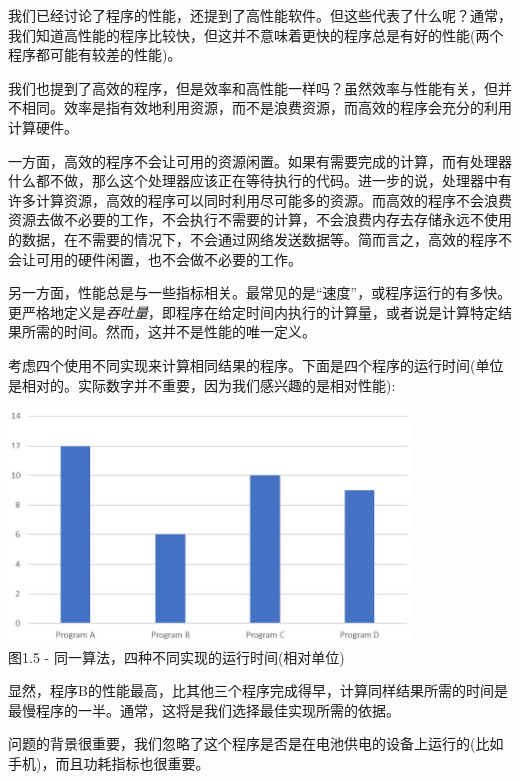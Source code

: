 我们已经讨论了程序的性能，还提到了高性能软件。但这些代表了什么呢？通常，我们知道高性能的程序比较快，但这并不意味着更快的程序总是有好的性能(两个程序都可能有较差的性能)。

我们也提到了高效的程序，但是效率和高性能一样吗？虽然效率与性能有关，但并不相同。效率是指有效地利用资源，而不是浪费资源，而高效的程序会充分的利用计算硬件。

一方面，高效的程序不会让可用的资源闲置。如果有需要完成的计算，而有处理器什么都不做，那么这个处理器应该正在等待执行的代码。进一步的说，处理器中有许多计算资源，高效的程序可以同时利用尽可能多的资源。而高效的程序不会浪费资源去做不必要的工作，不会执行不需要的计算，不会浪费内存去存储永远不使用的数据，在不需要的情况下，不会通过网络发送数据等。简而言之，高效的程序不会让可用的硬件闲置，也不会做不必要的工作。

另一方面，性能总是与一些指标相关。最常见的是“速度”，或程序运行的有多快。更严格地定义是\textit{吞吐量}，即程序在给定时间内执行的计算量，或者说是计算特定结果所需的时间。然而，这并不是性能的唯一定义。


考虑四个使用不同实现来计算相同结果的程序。下面是四个程序的运行时间(单位是相对的。实际数字并不重要，因为我们感兴趣的是相对性能):

\begin{center}
\includegraphics[width=0.8\textwidth]{content/1/chapter1/images/5.jpg}\\
图1.5 - 同一算法，四种不同实现的运行时间(相对单位)
\end{center}

显然，程序B的性能最高，比其他三个程序完成得早，计算同样结果所需的时间是最慢程序的一半。通常，这将是我们选择最佳实现所需的依据。

问题的背景很重要，我们忽略了这个程序是否是在电池供电的设备上运行的(比如手机)，而且功耗指标也很重要。

